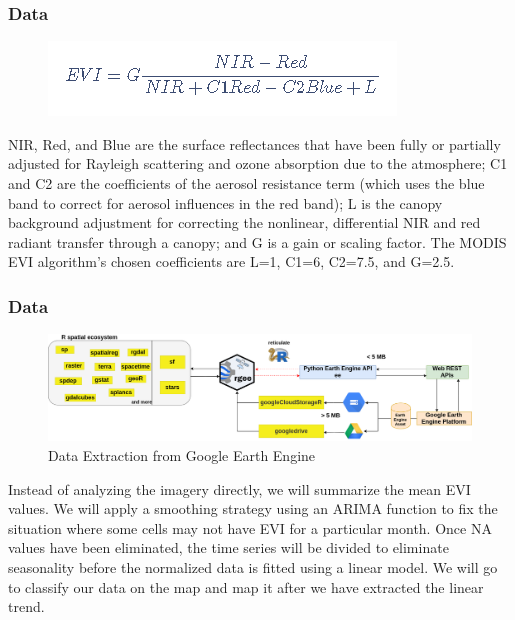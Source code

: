 \documentclass[11pt]{beamer}
\begin{document}
\begin{frame}
	\frametitle{Data}
\begin{figure}
	\centering
	\includegraphics[width=0.7\linewidth]{images/EVI}
	\caption{}
	\label{fig:evi}
\end{figure}

	
NIR, Red, and Blue are the surface reflectances that have been fully or partially adjusted for Rayleigh scattering and ozone absorption due to the atmosphere; C1 and C2 are the coefficients of the aerosol resistance term (which uses the blue band to correct for aerosol influences in the red band); L is the canopy background adjustment for correcting the nonlinear, differential NIR and red radiant transfer through a canopy; and G is a gain or scaling factor. The MODIS EVI algorithm's chosen coefficients are L=1, C1=6, C2=7.5, and G=2.5.
	
\end{frame}

\begin{frame}
	\frametitle{Data}
	\begin{figure}
		\centering
		\includegraphics[width=0.7\linewidth]{images/DataExtraction}
		\caption{Data Extraction from Google Earth Engine}
		\label{fig:dataextraction}
	\end{figure}
	
	Instead of analyzing the imagery directly, we will summarize the mean EVI values. We will apply a smoothing strategy using an ARIMA function to fix the situation where some cells may not have EVI for a particular month. Once NA values have been eliminated, the time series will be divided to eliminate seasonality before the normalized data is fitted using a linear model. We will go to classify our data on the map and map it after we have extracted the linear trend.
	
\end{frame}
\end{document}
